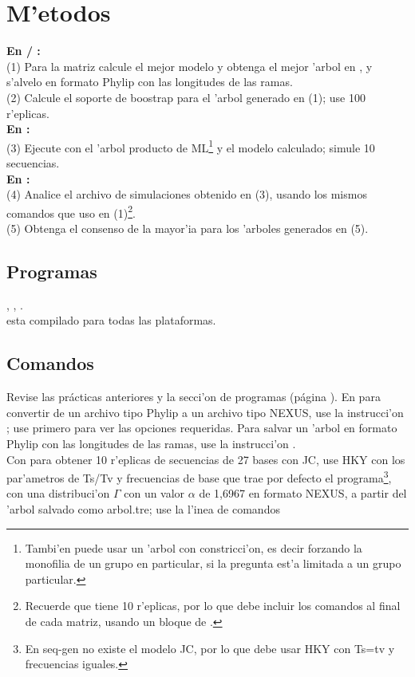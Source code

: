 \section{M'etodos}
\noindent
\textbf{En  / :}\\
(1) Para la matriz calcule el mejor modelo y obtenga el mejor 'arbol en , y s'alvelo en formato Phylip con las longitudes de las ramas.\\
(2) Calcule el soporte de boostrap para el 'arbol generado en (1); use 100 r'eplicas.\\
\textbf{En :}\\
(3) Ejecute  con el 'arbol producto de ML\footnote{Tambi'en puede usar un 'arbol con constricci'on, es decir forzando la monofilia de un grupo en particular, si la pregunta est'a limitada a un grupo particular.} y el modelo calculado; simule 10 secuencias.\\
\textbf{En :}\\
(4) Analice el archivo de simulaciones obtenido en (3), usando los mismos comandos que uso en (1)\footnote{Recuerde que tiene 10 r'eplicas, por lo que debe incluir los comandos al final de cada matriz, usando un bloque de .}.\\
(5) Obtenga el consenso de la mayor'ia para los 'arboles generados en (5).
\subsection{Programas}
\noindent
{}, , .\\
 esta compilado para todas las plataformas.
\subsection{Comandos}
Revise las pr\'acticas anteriores y la secci'on de programas (p\'agina \pageref{ch:programas}). En  para convertir de un archivo tipo Phylip a un archivo tipo NEXUS, use la instrucci'on ; use primero  para ver las opciones requeridas. Para salvar un 'arbol en formato Phylip con las longitudes de las ramas, use la instrucci'on .\\
Con  para obtener 10 r'eplicas  de secuencias de 27 bases  
con JC, use HKY  con los par'ametros de Ts/Tv y frecuencias de base que trae por defecto el programa\footnote{En seq-gen no existe el modelo JC, por lo que debe usar HKY con Ts=tv y frecuencias iguales.},  con una distribuci'on $\Gamma$ con un valor $\alpha$ de 1,6967  en formato NEXUS, a partir del 'arbol salvado como arbol.tre; use la l'inea de comandos\\

